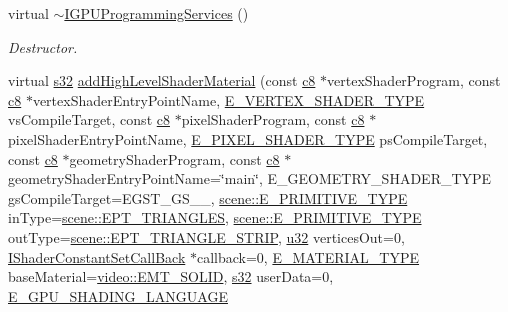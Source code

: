 \begin{DoxyCompactItemize}
\item 
\mbox{\label{classirr_1_1video_1_1IGPUProgrammingServices_a09d143ea5c55840c15ebcb84e8539bc0}} 
virtual \hyperlink{classirr_1_1video_1_1IGPUProgrammingServices_a09d143ea5c55840c15ebcb84e8539bc0}{$\sim$\+I\+G\+P\+U\+Programming\+Services} ()
\begin{DoxyCompactList}\small\item\em Destructor. \end{DoxyCompactList}\item 
virtual \hyperlink{namespaceirr_ac66849b7a6ed16e30ebede579f9b47c6}{s32} \hyperlink{classirr_1_1video_1_1IGPUProgrammingServices_a4a8d3b727ee9223d8baa353b82da0478}{add\+High\+Level\+Shader\+Material} (const \hyperlink{namespaceirr_a9395eaea339bcb546b319e9c96bf7410}{c8} $\ast$vertex\+Shader\+Program, const \hyperlink{namespaceirr_a9395eaea339bcb546b319e9c96bf7410}{c8} $\ast$vertex\+Shader\+Entry\+Point\+Name, \hyperlink{namespaceirr_1_1video_a9decae50d4dc2455e7b009f5c71b24f9}{E\+\_\+\+V\+E\+R\+T\+E\+X\+\_\+\+S\+H\+A\+D\+E\+R\+\_\+\+T\+Y\+PE} vs\+Compile\+Target, const \hyperlink{namespaceirr_a9395eaea339bcb546b319e9c96bf7410}{c8} $\ast$pixel\+Shader\+Program, const \hyperlink{namespaceirr_a9395eaea339bcb546b319e9c96bf7410}{c8} $\ast$pixel\+Shader\+Entry\+Point\+Name, \hyperlink{namespaceirr_1_1video_a07fb77e9aec681402ad376f7ef9b724c}{E\+\_\+\+P\+I\+X\+E\+L\+\_\+\+S\+H\+A\+D\+E\+R\+\_\+\+T\+Y\+PE} ps\+Compile\+Target, const \hyperlink{namespaceirr_a9395eaea339bcb546b319e9c96bf7410}{c8} $\ast$geometry\+Shader\+Program, const \hyperlink{namespaceirr_a9395eaea339bcb546b319e9c96bf7410}{c8} $\ast$geometry\+Shader\+Entry\+Point\+Name=\char`\"{}main\char`\"{}, E\+\_\+\+G\+E\+O\+M\+E\+T\+R\+Y\+\_\+\+S\+H\+A\+D\+E\+R\+\_\+\+T\+Y\+PE gs\+Compile\+Target=E\+G\+S\+T\+\_\+\+G\+S\+\_\+\_, \hyperlink{namespaceirr_1_1scene_a5d7de82f2169761194b2f44d95cdc1dc}{scene\+::\+E\+\_\+\+P\+R\+I\+M\+I\+T\+I\+V\+E\+\_\+\+T\+Y\+PE} in\+Type=\hyperlink{namespaceirr_1_1scene_a5d7de82f2169761194b2f44d95cdc1dca6c884c4de3210b3ed36c99fb828ce376}{scene\+::\+E\+P\+T\+\_\+\+T\+R\+I\+A\+N\+G\+L\+ES}, \hyperlink{namespaceirr_1_1scene_a5d7de82f2169761194b2f44d95cdc1dc}{scene\+::\+E\+\_\+\+P\+R\+I\+M\+I\+T\+I\+V\+E\+\_\+\+T\+Y\+PE} out\+Type=\hyperlink{namespaceirr_1_1scene_a5d7de82f2169761194b2f44d95cdc1dcab294abafc2b538342892eac7441faf3a}{scene\+::\+E\+P\+T\+\_\+\+T\+R\+I\+A\+N\+G\+L\+E\+\_\+\+S\+T\+R\+IP}, \hyperlink{namespaceirr_a0416a53257075833e7002efd0a18e804}{u32} vertices\+Out=0, \hyperlink{classirr_1_1video_1_1IShaderConstantSetCallBack}{I\+Shader\+Constant\+Set\+Call\+Back} $\ast$callback=0, \hyperlink{namespaceirr_1_1video_ac8e9b6c66f7cebabd1a6d30cbc5430f1}{E\+\_\+\+M\+A\+T\+E\+R\+I\+A\+L\+\_\+\+T\+Y\+PE} base\+Material=\hyperlink{namespaceirr_1_1video_ac8e9b6c66f7cebabd1a6d30cbc5430f1aa0b13db05ac3b5f40e692769de202660}{video\+::\+E\+M\+T\+\_\+\+S\+O\+L\+ID}, \hyperlink{namespaceirr_ac66849b7a6ed16e30ebede579f9b47c6}{s32} user\+Data=0, \hyperlink{namespaceirr_1_1video_a913671e32f20f13e51336bfbe20a82a3}{E\+\_\+\+G\+P\+U\+\_\+\+S\+H\+A\+D\+I\+N\+G\+\_\+\+L\+A\+N\+G\+U\+A\+GE} 
\end{DoxyCompactItemize}
